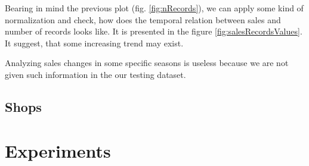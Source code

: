 \documentclass[12pt,twoside,a4paper]{memoir}
\begin{document}
	
 Bearing in mind the previous plot (fig. \ref{fig:nRecords}), we can apply some kind of normalization and check, how does the temporal relation between sales and number of records looks like. It is presented in the figure \ref{fig:salesRecordsValues}.
 It suggest, that some increasing trend may exist.

Analyzing sales changes in some specific seasons is useless because we are not given such information in the our testing dataset.

\subsection{Shops}



\section{Experiments}

\printbibliography
\end{document}
